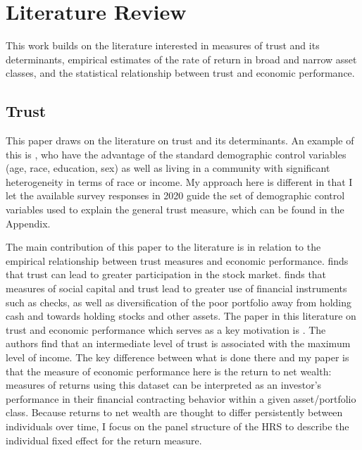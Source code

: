 \onlyinsubfile{\setcounter{section}{1}}
\section{Literature Review}
\label{sec:litrev}


\par This work builds on the literature interested in measures of trust and its determinants, empirical estimates of the rate of return in broad and narrow asset classes, and the statistical relationship between trust and economic performance. 

\subsection{Trust}

\par This paper draws on the literature on trust and its determinants. An example of this is \cite{Alesina2000}, who have the advantage of the standard demographic control variables (age, race, education, sex) as well as living in a community with significant heterogeneity in terms of race or income. My approach here is different in that I let the available survey responses in 2020 guide the set of demographic control variables used to explain the general trust measure, which can be found in the Appendix.  


\par The main contribution of this paper to the literature is in relation to the empirical relationship between trust measures and economic performance.  \cite{lgpslz2008} finds that trust can lead to greater participation in the stock market. \cite{Guiso2004} finds that measures of social capital and trust lead to greater use of financial instruments such as checks, as well as diversification of the poor portfolio away from holding cash and towards holding stocks and other assets. The paper in this literature on trust and economic performance which serves as a key motivation is \cite{jbpglg2016}. The authors find that an intermediate level of trust is associated with the maximum level of income. The key difference between what is done there and my paper is that the measure of economic performance here is the return to net wealth: measures of returns using this dataset can be interpreted as an investor's performance in their financial contracting behavior within a given asset/portfolio class. Because returns to net wealth are thought to differ persistently between individuals over time, I focus on the panel structure of the HRS to describe the individual fixed effect for the return measure. 

